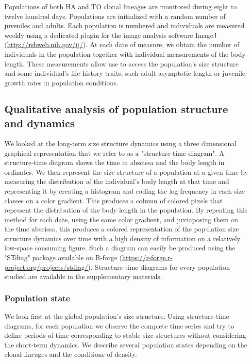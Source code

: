 Populations of both HA and TO clonal lineages are monitored during eight to
twelve hundred days. Populations are initialized with a random number of
juveniles and adults. Each population is numbered and individuals are measured
weekly using a dedicated plugin for the image analysis software ImageJ
\autocites{abramoff2004a,mallard2012a,mallard2013a}
(\url{http://rsbweb.nih.gov/ij/}).
At each date of measure, we obtain the number of individuals in the population together with
individual measurements of the body length. These measurements allow use to
access the population's size structure and some individual's life history
traits, such adult asymptotic length or juvenile growth rates in population
conditions.

\subsection{Qualitative analysis of population structure and dynamics}

We looked at the long-term size structure dynamics using a three dimensional
graphical representation that we refer to as a "structure-time diagram". A
structure-time diagram shows the time in abscissa and the body length in
ordinates. We then represent the size-structure of a population at a given time
by measuring the distribution of the individual’s body length at that time and
representing it by creating a histogram and coding the log-frequency in each
size-classes on a color gradient. This produces a column of colored pixels that
represent the distribution of the body length in the population. By repeating
this method for each date, using the same color gradient, and juxtaposing them
on the time abscissa, this produces a colored representation of the population
size structure dynamics over time with a high density of information on a
relatively low-space consuming figure. Such a diagram can easily be produced
using the "STdiag" package available on R-forge
(\url{https://r-forge.r-project.org/projects/stdiag/}). Structure-time diagrams
for every population studied are available in the supplementary materials.

\subsubsection{Population state}

We look first at the global population’s size structure. Using structure-time
diagrams, for each population we observe the complete time series and try to
define periods of time corresponding to stable size structures without
considering the short-term dynamics. We describe several population states
depending on the clonal lineages and the conditions of density.

